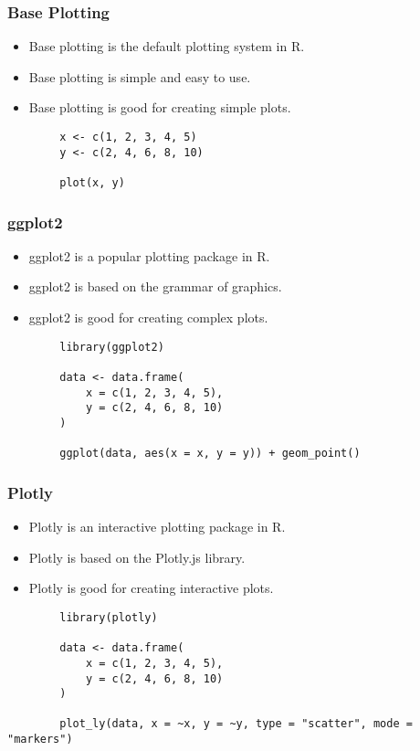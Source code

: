 \documentclass[serif, 9pt, aspectratio=32]{beamer}
\begin{document}
\begin{frame}
    \centering
    \frametitle{Base Plotting}
    \begin{itemize}
        \setlength{\itemsep}{2em}
        \item Base plotting is the default plotting system in R.
        \item Base plotting is simple and easy to use.
        \item Base plotting is good for creating simple plots.
    \end{itemize}
\end{frame}

\begin{frame}[fragile]
    \begin{lstlisting}
        x <- c(1, 2, 3, 4, 5)
        y <- c(2, 4, 6, 8, 10)

        plot(x, y)
    \end{lstlisting}
\end{frame}

\begin{frame}
    \centering
    \frametitle{ggplot2}
    \begin{itemize}
        \setlength{\itemsep}{2em}
        \item ggplot2 is a popular plotting package in R.
        \item ggplot2 is based on the grammar of graphics.
        \item ggplot2 is good for creating complex plots.
    \end{itemize}
\end{frame}

\begin{frame}[fragile]
    \begin{lstlisting}
        library(ggplot2)

        data <- data.frame(
            x = c(1, 2, 3, 4, 5),
            y = c(2, 4, 6, 8, 10)
        )

        ggplot(data, aes(x = x, y = y)) + geom_point()
    \end{lstlisting}
\end{frame}

\begin{frame}
    \centering
    \frametitle{Plotly}
    \begin{itemize}
        \setlength{\itemsep}{2em}
        \item Plotly is an interactive plotting package in R.
        \item Plotly is based on the Plotly.js library.
        \item Plotly is good for creating interactive plots.
    \end{itemize}
\end{frame}

\begin{frame}[fragile]
    \begin{lstlisting}
        library(plotly)

        data <- data.frame(
            x = c(1, 2, 3, 4, 5),
            y = c(2, 4, 6, 8, 10)
        )

        plot_ly(data, x = ~x, y = ~y, type = "scatter", mode = "markers")
    \end{lstlisting}
\end{frame}
\end{document}
